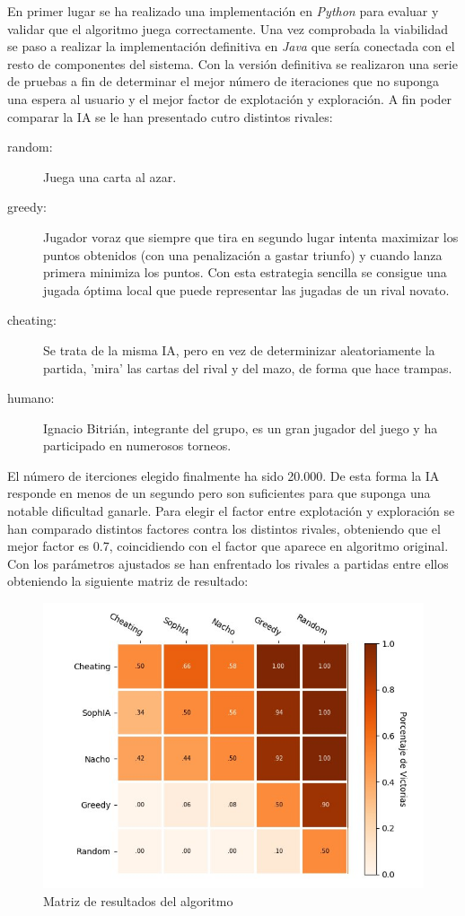 En primer lugar se ha realizado una implementación en \textit{Python} para evaluar y validar que el algoritmo juega correctamente. Una vez comprobada la viabilidad se paso a realizar la implementación definitiva en \textit{Java} que sería conectada con el resto de componentes del sistema. Con la versión definitiva se realizaron una serie de pruebas a fin de determinar el mejor número de iteraciones que no suponga una espera al usuario y el mejor factor de explotación y exploración. A fin poder comparar la IA se le han presentado cutro distintos rivales: 
\begin{description}
  \item[random: ] Juega una carta al azar.
  \item[greedy: ] Jugador voraz que siempre que tira en segundo lugar intenta maximizar los puntos obtenidos (con una penalización a gastar triunfo) y cuando lanza primera minimiza los puntos. Con esta estrategia sencilla se consigue una jugada óptima local que puede representar las jugadas de un rival novato.
  \item[cheating:] Se trata de la misma IA, pero en vez de determinizar aleatoriamente la partida, 'mira' las cartas del rival y del mazo, de forma que hace trampas.
  \item[humano:] Ignacio Bitrián, integrante del grupo, es un gran jugador del juego y ha participado en numerosos torneos.
\end{description}

El número de iterciones elegido finalmente ha sido 20.000. De esta forma la IA responde en menos de un segundo pero son suficientes para que suponga una notable dificultad ganarle. Para elegir el factor entre explotación y exploración se han comparado distintos factores contra los distintos rivales, obteniendo que el mejor factor es 0.7, coincidiendo con el factor que aparece en algoritmo original. Con los parámetros ajustados se han enfrentado los rivales a partidas entre ellos obteniendo la siguiente matriz de resultado:

\begin{figure}[H]
\centering
\includegraphics[scale = 0.7]{figuras/statsIA}
\caption{Matriz de resultados del algoritmo}
\label{fig:mcts}
\end{figure}

